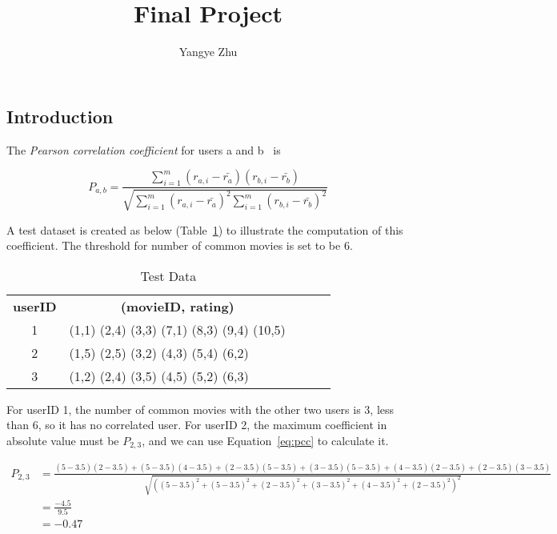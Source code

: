 \documentclass{article}
\title{\textbf {Final Project}}
\author{Yangye Zhu}
\date{}
\begin{document}
\maketitle
\begin{flushleft}
\section{Introduction}

The \emph{Pearson correlation coefficient} for users a and b~\cite{CME211:2013:FinalProjectPart1} is

\begin{equation}
P_{a,b} = \frac{\sum\limits_{i=1}^{m}(r_{a,i}-\bar{r_a})(r_{b,i}-\bar{r_b})}{\sqrt{\sum\limits_{i=1}^{m}(r_{a,i}-\bar{r_a})^2\sum\limits_{i=1}^{m}(r_{b,i}-\bar{r_b})^2}} 
\label{eq:pcc}
\end{equation}

A test dataset is created as below (Table~\ref{table:dataset}) to illustrate the computation of this coefficient. The threshold for number of common movies is set to be 6.

\begin{table}[h]
\begin{center}
\caption{Test Data}
\begin{tabular}{|c|l|lll}
\cline{1-2}
\textbf{userID} & \multicolumn{1}{|c|}{\textbf{(movieID, rating)}} &  &  &  \\ \cline{1-2}
1               & (1,1) (2,4) (3,3) (7,1) (8,3) (9,4) (10,5)       &  &  &  \\ \cline{1-2}
2               & (1,5) (2,5) (3,2) (4,3) (5,4) (6,2)              &  &  &  \\ \cline{1-2}
3               & (1,2) (2,4) (3,5) (4,5) (5,2) (6,3)              &  &  &  \\ \cline{1-2}
\end{tabular}
\label{table:dataset}
\end{center}
\end{table}
\vspace{5 mm}
For userID 1, the number of common movies with the other two users is 3, less than 6, so it has no correlated user. For userID 2,  the maximum coefficient in absolute value must be $P_{2, 3}$, and we can use Equation~\ref{eq:pcc} to calculate it.

\begin{tiny}
\begin{equation}
\begin{split}
P_{2,3} &= \frac{(5-3.5)(2-3.5)+(5-3.5)(4-3.5)+(2-3.5)(5-3.5)+(3-3.5)(5-3.5)+(4-3.5)(2-3.5)+(2-3.5)(3-3.5)}{\sqrt{((5-3.5)^2+(5-3.5)^2+(2-3.5)^2+(3-3.5)^2+(4-3.5)^2+(2-3.5)^2)^2}} \\
            &= \frac{-4.5}{9.5} \\
            &= -0.47
\end{split}
\end{equation}
\end{tiny}


\end{flushleft}
\end{document}
